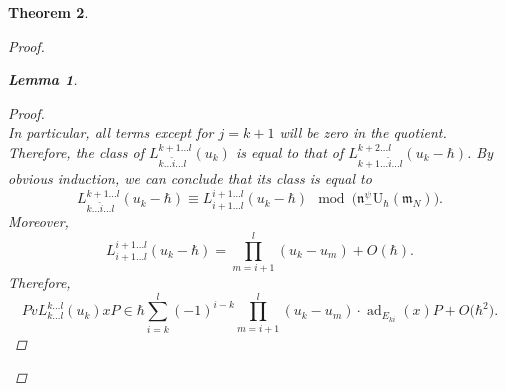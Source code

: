 \documentclass[pdftex]{sigma}
\numberwithin{equation}{section}
\newtheorem{Theorem}{Theorem}[section]
\newtheorem{Lemma}[Theorem]{Lemma}
\newcommand{\U}{\mathrm{U}_{\hbar}}
\newcommand{\n}{\mathfrak{n}}
\newcommand{\m}{\mathfrak{m}}
\DeclareMathOperator{\ad}{ad}
\begin{document}
\begin{Theorem}
\begin{proof}
\begin{Lemma}
\begin{proof}
\[					\]
					In particular, all terms except for $j=k+1$ will be zero in the quotient. Therefore, the class of $L_{k \dots \hat{i} \dots l}^{k+1 \dots l}(u_k)$ is equal to that of $L_{k+1\dots \hat{i} \dots l}^{k+2 \dots l}(u_k-\hbar)$. By obvious induction, we can conclude that its class is equal to
					\begin{equation}
						\label{eq::class_quot}
						L_{k \dots \hat{i} \dots l}^{k+1 \dots l}(u_k-\hbar) \equiv L_{i+1\dots l}^{i+1\dots l}(u_k-\hbar) \mod\bigl(\n_-^{\psi} \U(\m_N)\bigr).
					\end{equation}
					Moreover,
					\[
					L_{i+1\dots l}^{i+1\dots l}(u_k-\hbar) = \prod\limits_{m=i+1}^l (u_k - u_m) + O(\hbar).
					\]
					Therefore,
					\begin{equation}
						\label{eq::action_minor}
						Pv L_{k\dots l}^{k \dots l}(u_k) x P \in \hbar \sum\limits_{i=k}^l (-1)^{i-k} \prod_{m=i+1}^l (u_k - u_m) \cdot \ad_{E_{ki}}(x) P + O\bigl(\hbar^2\bigr).
					\end{equation}
					

\end{proof}
\end{Lemma}
\end{proof}
\end{Theorem}
\end{document}
